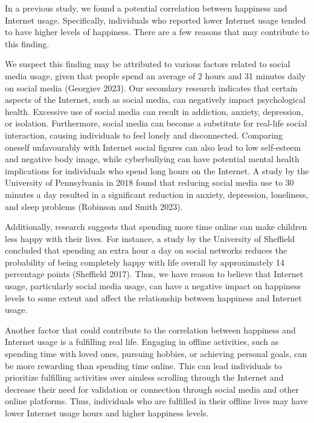\documentclass[
]{article}
\begin{document}
In a previous study, we found a potential correlation between happiness
and Internet usage. Specifically, individuals who reported lower
Internet usage tended to have higher levels of happiness. There are a
few reasons that may contribute to this finding.

We suspect this finding may be attributed to various factors related to
social media usage, given that people spend an average of 2 hours and 31
minutes daily on social media (Georgiev 2023). Our secondary research
indicates that certain aspects of the Internet, such as social media,
can negatively impact psychological health. Excessive use of social
media can result in addiction, anxiety, depression, or isolation.
Furthermore, social media can become a substitute for real-life social
interaction, causing individuals to feel lonely and disconnected.
Comparing oneself unfavourably with Internet social figures can also
lead to low self-esteem and negative body image, while cyberbullying can
have potential mental health implications for individuals who spend long
hours on the Internet. A study by the University of Pennsylvania in 2018
found that reducing social media use to 30 minutes a day resulted in a
significant reduction in anxiety, depression, loneliness, and sleep
problems (Robinson and Smith 2023).

Additionally, research suggests that spending more time online can make
children less happy with their lives. For instance, a study by the
University of Sheffield concluded that spending an extra hour a day on
social networks reduces the probability of being completely happy with
life overall by approximately 14 percentage points (Sheffield 2017).
Thus, we have reason to believe that Internet usage, particularly social
media usage, can have a negative impact on happiness levels to some
extent and affect the relationship between happiness and Internet usage.

Another factor that could contribute to the correlation between
happiness and Internet usage is a fulfilling real life. Engaging in
offline activities, such as spending time with loved ones, pursuing
hobbies, or achieving personal goals, can be more rewarding than
spending time online. This can lead individuals to prioritize fulfilling
activities over aimless scrolling through the Internet and decrease
their need for validation or connection through social media and other
online platforms. Thus, individuals who are fulfilled in their offline
lives may have lower Internet usage hours and higher happiness levels.
\end{document}
